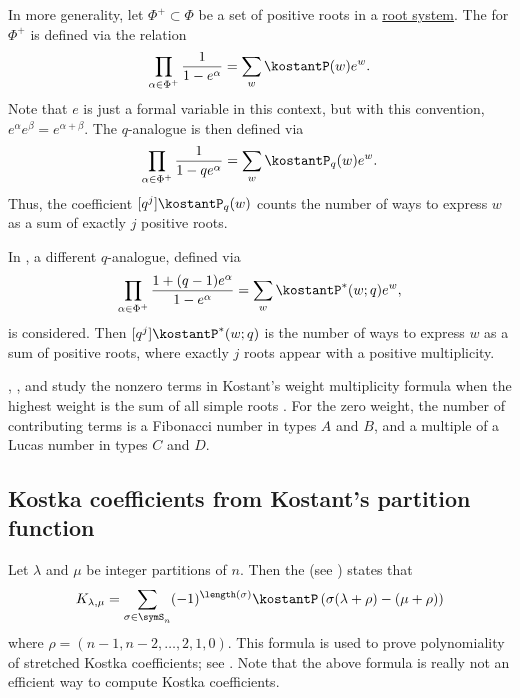 In more generality, let $\Phi^+ \subset \Phi$ be a set of positive roots in a
\hyperref[rootSystem]{root system}.  The 
\label{kostantPartitionFunctionGeneralType} for $\Phi^+$ is defined via the
relation
\begin{equation*}
\prod_{\alpha \in \Phi^+}  \frac{1}{1-e^\alpha} = \sum_{w} \kostantP(w) e^w.
\end{equation*}
Note that $e$ is just a formal variable in this context, but with this convention,
$e^{\alpha} e^{\beta} = e^{\alpha + \beta}$.
The $q$-analogue is then defined via
\begin{equation*}
\prod_{\alpha \in \Phi^+}  \frac{1}{1-q e^\alpha} = \sum_{w} \kostantP_q(w) e^w.
\end{equation*}
Thus, the coefficient $[q^j]\kostantP_q(w)$ counts the number of ways to express $w$
as a sum of exactly $j$ positive roots.

In \cite{RassartThesis}, a different $q$-analogue, defined via
\begin{equation*}
\prod_{\alpha \in \Phi^+}  \frac{1+(q-1)e^\alpha}{1- e^\alpha} = \sum_{w} \kostantP^*(w;q) e^w,
\end{equation*}
is considered.  Then $[q^j]\kostantP^*(w;q)$ is the number of ways to express $w$
as a sum of positive roots, where exactly $j$ roots appear with a positive multiplicity.

, , and
 study the nonzero terms in Kostant's weight multiplicity
formula when the highest weight is the sum of all simple roots
\cite{ChangHarrisInsko2020}.  For the zero weight, the number of contributing
terms is a Fibonacci number in types $A$ and $B$, and a multiple of a Lucas
number in types $C$ and $D$.


\subsection[kostkaFromKostant]{Kostka coefficients from Kostant's partition function}

Let $\lambda$ and $\mu$ be integer partitions of $n$.
Then the 
\label{kostantMultiplicityFormula} (see \cite[(1.1.5)]{Kostant1959}) states
that
\[
K_{\lambda,\mu} = \sum_{\sigma \in \symS_n}
(-1)^{\length(\sigma)} \kostantP\left( \sigma(\lambda + \rho) - (\mu+\rho) \right)
\]
where $\rho = (n-1,n-2,\dotsc,2,1,0)$.
This formula is used to prove polynomiality of stretched Kostka coefficients;
see \cite{BilleyGuilleminRassart2004}.
Note that the above formula is really not an efficient way to compute Kostka coefficients.


